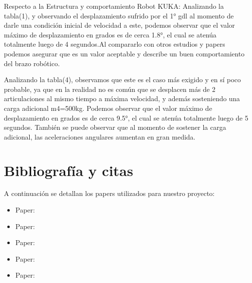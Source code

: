 \documentclass{aleph-revista}
\begin{document}
Respecto a la Estructura y comportamiento Robot KUKA:
Analizando la tabla(1), y observando el desplazamiento sufrido por el 1° gdl al momento de darle una condición inicial de velocidad a este, podemos observar que el valor máximo de desplazamiento en grados es de cerca 1.8°, el cual se atenúa totalmente luego de 4 segundos.Al compararlo con otros estudios y papers podemos asegurar que es un valor aceptable y describe un buen comportamiento del brazo robótico.

Analizando la tabla(4), observamos que este es el caso más exigido y en sí poco probable, ya que en la realidad no es común que se desplacen más de 2 articulaciones al mismo tiempo a máxima velocidad, y además sosteniendo una carga adicional m4=500kg. Podemos observar que el valor máximo de desplazamiento en grados es de cerca 9.5°, el cual se atenúa totalmente luego de 5 segundos. También se puede observar que al momento de sostener la carga adicional, las aceleraciones angulares aumentan en gran medida.

\section{Bibliografía y citas}

A continuación se detallan los papers utilizados para nuestro proyecto:
\begin{itemize}
    \item Paper: \cite{Bib01}
    \item Paper: \cite{Bib02}
    \item Paper: \cite{Bib06}
    \item Paper: \cite{Bib03}
    \item Paper: \cite{Bib04}
\end{itemize}

\printbibliography
\end{document}
